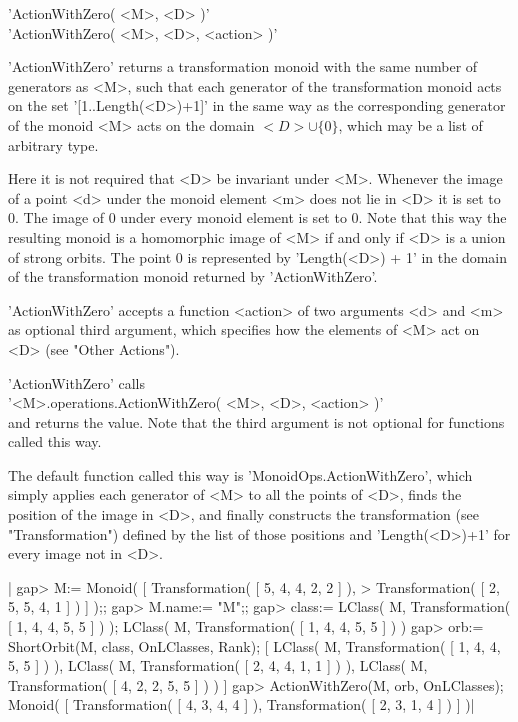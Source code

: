 
'ActionWithZero( <M>, <D> )'\\
'ActionWithZero( <M>, <D>, <action> )'

'ActionWithZero' returns a transformation  monoid with the same number of
generators as <M>, such that each  generator of the transformation monoid
acts on the set '[1..Length(<D>)+1]' in the same way as the corresponding
generator of the monoid  <M> acts on the  domain $<D> \cup  \{0\}$, which
may be a list of arbitrary type.

Here it is not  required that <D> be invariant  under <M>.   Whenever the
image of a point <d> under the monoid element <m> does not  lie in <D> it
is set  to $0$.  The image  of $0$ under every  monoid element  is set to
$0$.  Note that  this way the resulting monoid  is a homomorphic image of
<M>  if and only  if <D> is a  union of strong orbits.   The point $0$ is
represented by  'Length(<D>)  + 1'  in the  domain of  the transformation
monoid returned by 'ActionWithZero'.

'ActionWithZero' accepts a function <action> of two arguments <d> and <m>
as optional third argument, which  specifies how the  elements of <M> act
on <D> (see "Other Actions").

'ActionWithZero' calls \\
'<M>.operations.ActionWithZero( <M>, <D>, <action> )' \\
and returns the value.  Note that the  third argument is not optional for
functions called this way.

The default function called this way is 'MonoidOps.ActionWithZero', which
simply applies each generator of <M> to all  the points of <D>, finds the
position of  the image in <D>, and  finally constructs the transformation
(see  "Transformation") defined  by   the  list  of those  positions  and
'Length(<D>)+1' for every image not in <D>.

|    gap> M:= Monoid( [ Transformation( [ 5, 4, 4, 2, 2 ] ), 
    > Transformation( [ 2, 5, 5, 4, 1 ] ) ] );;
    gap> M.name:= "M";;
    gap> class:= LClass( M, Transformation( [ 1, 4, 4, 5, 5 ] ) );
    LClass( M, Transformation( [ 1, 4, 4, 5, 5 ] ) )
    gap> orb:= ShortOrbit(M, class, OnLClasses, Rank);
    [ LClass( M, Transformation( [ 1, 4, 4, 5, 5 ] ) ), 
      LClass( M, Transformation( [ 2, 4, 4, 1, 1 ] ) ), 
      LClass( M, Transformation( [ 4, 2, 2, 5, 5 ] ) ) ]
    gap> ActionWithZero(M, orb, OnLClasses);
    Monoid( [ Transformation( [ 4, 3, 4, 4 ] ), 
     Transformation( [ 2, 3, 1, 4 ] ) ] )|


